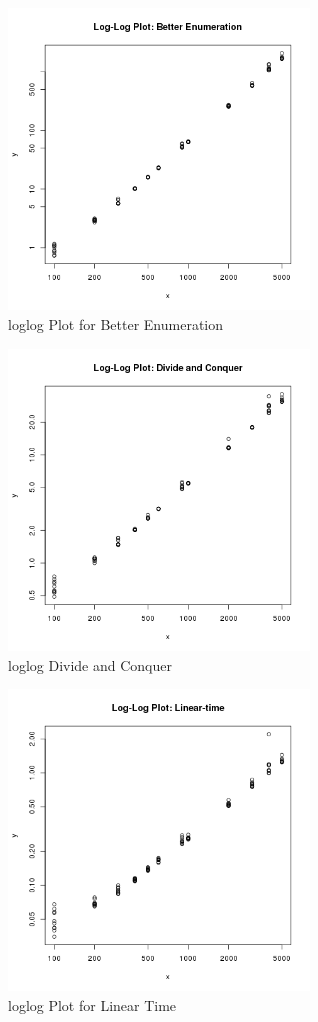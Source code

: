 \documentclass[11pt]{scrreprt}
\begin{document}
\begin{figure}[!htb]
\centering
\includegraphics[width=8cm]{loglog_better_enumeration.png}
\caption{loglog Plot for Better Enumeration}
\label{figc1}
\end{figure}

\begin{figure}[!htb]
\centering
\includegraphics[width=8cm]{loglog_divide_n_conquer.png}
\caption{loglog Divide and Conquer}
\label{figc1}
\end{figure}


\begin{figure}[!htb]
\centering
\includegraphics[width=8cm]{loglog_linear_time.png}
\caption{loglog Plot for Linear Time}
\label{figc1}
\end{figure}
\end{document}
